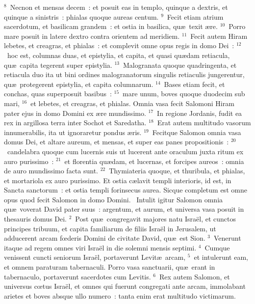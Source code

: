 ${}^{8}$~Necnon et mensas decem~: et posuit eas in templo, quinque a dextris, et quinque a sinistris~: phialas quoque aureas centum.
${}^{9}$~Fecit etiam atrium sacerdotum, et basilicam grandem~: et ostia in basilica, qu\ae\ texit \ae re.
${}^{10}$~Porro mare posuit in latere dextro contra orientem ad meridiem.
${}^{11}$~Fecit autem Hiram lebetes, et creagras, et phialas~: et complevit omne opus regis in domo Dei~:
${}^{12}$~hoc est, columnas duas, et epistylia, et capita, et quasi qu\ae dam retiacula, qu\ae\ capita tegerent super epistylia.
${}^{13}$~Malogranata quoque quadringenta, et retiacula duo ita ut bini ordines malogranatorum singulis retiaculis jungerentur, qu\ae\ protegerent epistylia, et capita columnarum.
${}^{14}$~Bases etiam fecit, et conchas, quas superposuit basibus~:
${}^{15}$~mare unum, boves quoque duodecim sub mari,
${}^{16}$~et lebetes, et creagras, et phialas. Omnia vasa fecit Salomoni Hiram pater ejus in domo Domini ex \ae re mundissimo.
${}^{17}$~In regione Jordanis, fudit ea rex in argillosa terra inter Sochot et Saredatha.
${}^{18}$~Erat autem multitudo vasorum innumerabilis, ita ut ignoraretur pondus \ae ris.
${}^{19}$~Fecitque Salomon omnia vasa domus Dei, et altare aureum, et mensas, et super eas panes propositionis~:
${}^{20}$~candelabra quoque cum lucernis suis ut lucerent ante oraculum juxta ritum ex auro purissimo~:
${}^{21}$~et florentia qu\ae dam, et lucernas, et forcipes aureos~: omnia de auro mundissimo facta sunt.
${}^{22}$~Thymiateria quoque, et thuribula, et phialas, et mortariola ex auro purissimo. Et ostia c\ae lavit templi interioris, id est, in Sancta sanctorum~: et ostia templi forinsecus aurea. Sicque completum est omne opus quod fecit Salomon in domo Domini.
~Intulit igitur Salomon omnia qu\ae\ voverat David pater suus~: argentum, et aurum, et universa vasa posuit in thesauris domus Dei.
${}^{2}$~Post qu\ae\ congregavit majores natu Isra\"el, et cunctos principes tribuum, et capita familiarum de filiis Isra\"el in Jerusalem, ut adducerent arcam fœderis Domini de civitate David, qu\ae\ est Sion.
${}^{3}$~Venerunt itaque ad regem omnes viri Isra\"el in die solemni mensis septimi.
${}^{4}$~Cumque venissent cuncti seniorum Isra\"el, portaverunt Levit\ae\ arcam,
${}^{5}$~et intulerunt eam, et omnem paraturam tabernaculi. Porro vasa sanctuarii, qu\ae\ erant in tabernaculo, portaverunt sacerdotes cum Levitis.
${}^{6}$~Rex autem Salomon, et universus cœtus Isra\"el, et omnes qui fuerunt congregati ante arcam, immolabant arietes et boves absque ullo numero~: tanta enim erat multitudo victimarum.
